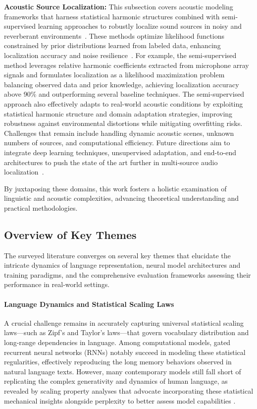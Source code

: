 \documentclass[sigconf]{acmart}
\begin{document}
\textbf{Acoustic Source Localization:} This subsection covers acoustic modeling frameworks that harness statistical harmonic structures combined with semi-supervised learning approaches to robustly localize sound sources in noisy and reverberant environments~\cite{ref1,ref2,ref3,ref26,ref51,ref52}. These methods optimize likelihood functions constrained by prior distributions learned from labeled data, enhancing localization accuracy and noise resilience~\cite{ref52}. For example, the semi-supervised method leverages relative harmonic coefficients extracted from microphone array signals and formulates localization as a likelihood maximization problem balancing observed data and prior knowledge, achieving localization accuracy above 90\% and outperforming several baseline techniques. The semi-supervised approach also effectively adapts to real-world acoustic conditions by exploiting statistical harmonic structure and domain adaptation strategies, improving robustness against environmental distortions while mitigating overfitting risks. Challenges that remain include handling dynamic acoustic scenes, unknown numbers of sources, and computational efficiency. Future directions aim to integrate deep learning techniques, unsupervised adaptation, and end-to-end architectures to push the state of the art further in multi-source audio localization~\cite{ref52}.

By juxtaposing these domains, this work fosters a holistic examination of linguistic and acoustic complexities, advancing theoretical understanding and practical methodologies.

\subsection{Overview of Key Themes}

The surveyed literature converges on several key themes that elucidate the intricate dynamics of language representation, neural model architectures and training paradigms, and the comprehensive evaluation frameworks assessing their performance in real-world settings.

\paragraph{Language Dynamics and Statistical Scaling Laws}  
A crucial challenge remains in accurately capturing universal statistical scaling laws—such as Zipf’s and Taylor’s laws—that govern vocabulary distribution and long-range dependencies in language. Among computational models, gated recurrent neural networks (RNNs) notably succeed in modeling these statistical regularities, effectively reproducing the long memory behaviors observed in natural language texts. However, many contemporary models still fall short of replicating the complex generativity and dynamics of human language, as revealed by scaling property analyses that advocate incorporating these statistical mechanical insights alongside perplexity to better assess model capabilities \cite{ref51}.
\end{document}
